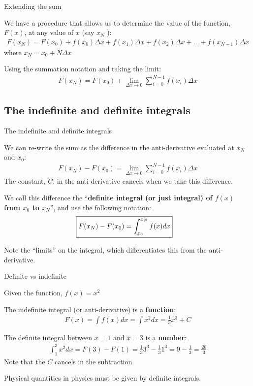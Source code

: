 \documentclass[aspectratio=169,
hyperref={colorlinks,urlcolor=blue}
]{beamer}
\begin{document}



\begin{bulletframe}{Extending the sum}
\item We have a procedure that allows us to determine the value of the function, $F(x)$, at any value of $x$ (say $x_N$ ):
\begin{align*}
F(x_N) = F(x_0)+f(x_0)\Delta x + f(x_1)\Delta x+ f(x_2)\Delta x+\dots + f(x_{N-1})\Delta x
\end{align*}
where $x_N=x_0+N\Delta x$
\item Using the summation notation and taking the limit:
\begin{align*}
F(x_N) = F(x_0)+\lim_{\Delta x \to 0}\sum_{i=0}^{N-1}f(x_i)\Delta x
\end{align*}
\end{bulletframe}


\subsection{The indefinite and definite integrals}
\label{subsec:indefanddefintegrals}
\begin{bulletframe}{The indefinite and definite integrals}
\item We can re-write the sum as the difference in the anti-derivative evaluated at $x_N$ and $x_0$:
\begin{align*}
F(x_N) - F(x_0)=\lim_{\Delta x \to 0}\sum_{i=0}^{N-1}f(x_i)\Delta x
\end{align*}
The constant, $C$, in the anti-derivative cancels when we take this difference.
\item We call this difference the ``\textbf{definite integral (or just integral) of $f(x)$ from $x_0$  to $x_N$}'', and use the following notation:
\begin{align*}
\Aboxed{F(x_N) - F(x_0)=\int_{x_0}^{x_N}f(x)dx}
\end{align*}
\item Note the ``limits'' on the integral, which differentiates this from the anti-derivative.
\end{bulletframe}


\begin{bulletframe}{Definite vs indefinite}
\item Given the function, $f(x)=x^2$
\item The indefinite integral (or anti-derivative) is a \textbf{function}:
\begin{align*}
F(x) = \int f(x) dx=\int x^2dx = \frac{1}{3}x^3+C
\end{align*}
\item The definite integral between $x=1$ and $x=3$ is a \textbf{number}:
\begin{align*}
\int_1^3x^2dx = F(3) - F(1) = \frac{1}{3}3^3-\frac{1}{3}1^3=9-\frac{1}{3}=\frac{26}{3}
\end{align*}
Note that the $C$ cancels in the subtraction.
\item Physical quantities in physics must be given by definite integrals.
\end{bulletframe}
\end{document}
